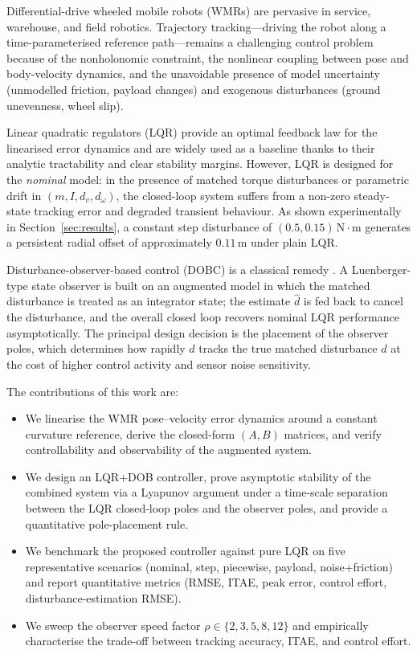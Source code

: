 \documentclass[conference]{IEEEtran}
\begin{document}
Differential-drive wheeled mobile robots (WMRs) are pervasive in service,
warehouse, and field robotics. Trajectory tracking---driving the robot along
a time-parameterised reference path---remains a challenging control problem
because of the nonholonomic constraint, the nonlinear coupling between pose
and body-velocity dynamics, and the unavoidable presence of model uncertainty
(unmodelled friction, payload changes) and exogenous disturbances (ground
unevenness, wheel slip).

Linear quadratic regulators (LQR) provide an optimal feedback law for the
linearised error dynamics and are widely used as a baseline thanks to their
analytic tractability and clear stability margins. However, LQR is designed
for the \emph{nominal} model: in the presence of matched torque disturbances
or parametric drift in $(m, I, d_v, d_\omega)$, the closed-loop system
suffers from a non-zero steady-state tracking error and degraded transient
behaviour. As shown experimentally in Section~\ref{sec:results}, a constant
step disturbance of $(0.5,0.15)\,\mathrm{N}\!\cdot\!\mathrm{m}$ generates a
persistent radial offset of approximately $0.11$\,m under plain LQR.

Disturbance-observer-based control (DOBC) is a classical remedy
\cite{ohnishi1996,chen2016disturbance}. A Luenberger-type state observer is
built on an augmented model in which the matched disturbance is treated as
an integrator state; the estimate $\hat d$ is fed back to cancel the
disturbance, and the overall closed loop recovers nominal LQR performance
asymptotically. The principal design decision is the placement of the
observer poles, which determines how rapidly $\hat d$ tracks the true
matched disturbance $d$ at the cost of higher control activity and sensor
noise sensitivity.

The contributions of this work are:
\begin{itemize}\setlength\itemsep{2pt}
\item We linearise the WMR pose--velocity error dynamics around a constant
curvature reference, derive the closed-form $(A,B)$ matrices, and verify
controllability and observability of the augmented system.
\item We design an LQR+DOB controller, prove asymptotic stability of the
combined system via a Lyapunov argument under a time-scale separation
between the LQR closed-loop poles and the observer poles, and provide a
quantitative pole-placement rule.
\item We benchmark the proposed controller against pure LQR on five
representative scenarios (nominal, step, piecewise, payload, noise+friction)
and report quantitative metrics (RMSE, ITAE, peak error, control effort,
disturbance-estimation RMSE).
\item We sweep the observer speed factor $\rho\in\{2,3,5,8,12\}$ and
empirically characterise the trade-off between tracking accuracy, ITAE, and
control effort.
\end{itemize}
\end{document}
